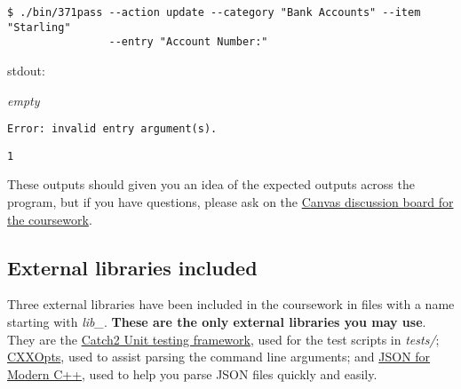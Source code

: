\documentclass[a4paper]{article}
\begin{document}
\begin{Verbatim}[formatcom=\bfseries]
$ ./bin/371pass --action update --category "Bank Accounts" --item "Starling"
                --entry "Account Number:"
\end{Verbatim}
\begin{labeling}{ stdout:}
    \item[stdout:]
    \emph{empty}
    
    \item[stderr:]
    \begin{lstlisting}[backgroundcolor = \color{lightgray},belowskip=0pt]
Error: invalid entry argument(s).
    \end{lstlisting}
    
    \item[exit:]
    \texttt{1}
\end{labeling}

These outputs should given you an idea of the expected outputs across the program, but if you have questions, please ask on the \hyperlink{https://canvas.swansea.ac.uk/courses/24793/discussion_topics/217912}{Canvas discussion board for the coursework}.


\subsection*{External libraries included}
Three external libraries have been included in the coursework in files with a name starting with \emph{lib\_}. \textbf{These are the only external libraries you may use}. They are the \href{https://github.com/catchorg/Catch2}{Catch2 Unit testing framework}, used for the test scripts in \emph{tests/}; \href{https://github.com/jarro2783/cxxopts}{CXXOpts}, used to assist parsing the command line arguments; and \href{https://github.com/nlohmann/json}{JSON for Modern C++}, used to help you parse JSON files quickly and easily.
\end{document}
